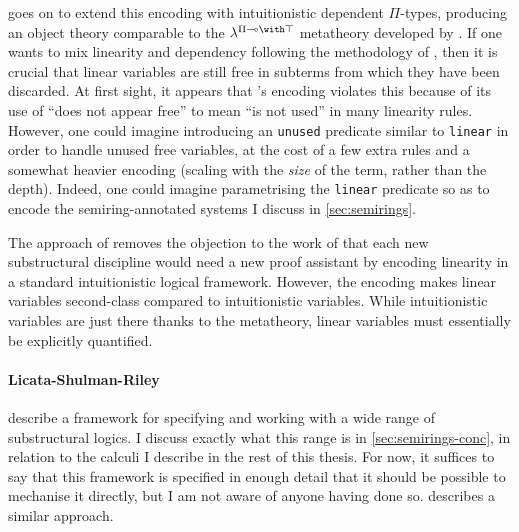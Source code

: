  goes on to extend this encoding with intuitionistic dependent
$\Pi$-types, producing an object theory comparable to the
$\lambda^{\Pi\multimap\with\top}$ metatheory developed by \citet{CP02}.
If one wants to mix linearity and dependency following the methodology of
\citet{Atkey18}, then it is crucial that linear variables are still free in
subterms from which they have been discarded.
At first sight, it appears that \citeauthor{crary10}'s encoding violates this
because of its use of ``does not appear free'' to mean ``is not used'' in many
linearity rules.
However, one could imagine introducing an \texttt{unused} predicate similar to
\texttt{linear} in order to handle unused free variables, at the cost of a few
extra rules and a somewhat heavier encoding (scaling with the \emph{size} of the
term, rather than the depth).
Indeed, one could imagine parametrising the \texttt{linear} predicate so as to
encode the semiring-annotated systems I discuss in \cref{sec:semirings}.

The approach of \citet{crary10} removes the objection to the work of
\citet{CP02} that each new substructural discipline would need a new proof
assistant by encoding linearity in a standard intuitionistic logical framework.
However, the encoding makes linear variables second-class compared to
intuitionistic variables.
While intuitionistic variables are just there thanks to the metatheory, linear
variables must essentially be explicitly quantified.

\paragraph{Licata-Shulman-Riley}
 describe a framework for specifying and working with a wide
range of substructural logics.
I discuss exactly what this range is in \cref{sec:semirings-conc}, in relation
to the calculi I describe in the rest of this thesis.
For now, it suffices to say that this framework is specified in enough detail
that it should be possible to mechanise it directly, but I am not aware of
anyone having done so.
 describes a similar approach.

